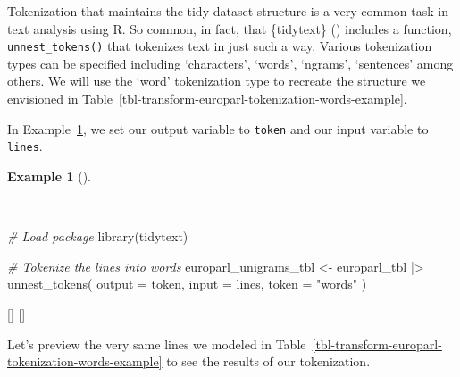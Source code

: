 \documentclass[
  letterpaper,
  krantz1]{latex/krantz-mod}
\newenvironment{Shaded}{\begin{snugshade}}{\end{snugshade}}
\newcommand{\AttributeTok}[1]{\textcolor[rgb]{0.00,0.00,0.00}{#1}}
\newcommand{\CommentTok}[1]{\textcolor[rgb]{0.00,0.00,0.00}{\textit{#1}}}
\newcommand{\FunctionTok}[1]{\textcolor[rgb]{0.00,0.00,0.00}{#1}}
\newcommand{\NormalTok}[1]{\textcolor[rgb]{0.00,0.00,0.00}{#1}}
\newcommand{\OtherTok}[1]{\textcolor[rgb]{0.00,0.00,0.00}{#1}}
\newcommand{\SpecialCharTok}[1]{\textcolor[rgb]{0.00,0.00,0.00}{#1}}
\newcommand{\StringTok}[1]{\textcolor[rgb]{0.00,0.00,0.00}{#1}}
\newcommand{\cindex}[1]{%
  \StrSubstitute{#1}{_}{\_}[\temp]%
  \index{\temp}%
}
\theoremstyle{definition}
\theoremstyle{definition}
\newtheorem{example}{Example}[chapter]
\theoremstyle{remark}
\begin{document}
Tokenization that maintains the tidy dataset structure is a very common
task in text analysis using R. So common, in fact,
that \{tidytext\} ()
includes a function, \texttt{unnest\_tokens()} that tokenizes text in
just such a way. Various tokenization types can be specified including
`characters', `words', `ngrams', `sentences' among others. We will use
the `word' tokenization type to recreate the structure we envisioned in
Table~\ref{tbl-transform-europarl-tokenization-words-example}.

In Example~\ref{exm-transform-europarl-tokenization-words-tidytext}, we
set our output variable to \texttt{token} and our input variable to
\texttt{lines}.

\begin{example}[]\protect\hypertarget{exm-transform-europarl-tokenization-words-tidytext}{}\label{exm-transform-europarl-tokenization-words-tidytext}

~

\begin{Shaded}
\begin{Highlighting}[numbers=left,,]
\CommentTok{\# Load package}
\FunctionTok{library}\NormalTok{(tidytext)}

\CommentTok{\# Tokenize the lines into words}
\NormalTok{europarl\_unigrams\_tbl }\OtherTok{\textless{}{-}}
\NormalTok{  europarl\_tbl }\SpecialCharTok{|\textgreater{}}
  \FunctionTok{unnest\_tokens}\NormalTok{(}
    \AttributeTok{output =}\NormalTok{ token,}
    \AttributeTok{input =}\NormalTok{ lines,}
    \AttributeTok{token =} \StringTok{"words"}
\NormalTok{  )}
\end{Highlighting}
\end{Shaded}

\cindex{unnest_tokens()}\cindex{library()}

\end{example}

Let's preview the very same lines we modeled in
Table~\ref{tbl-transform-europarl-tokenization-words-example} to see the
results of our tokenization.
\end{document}
